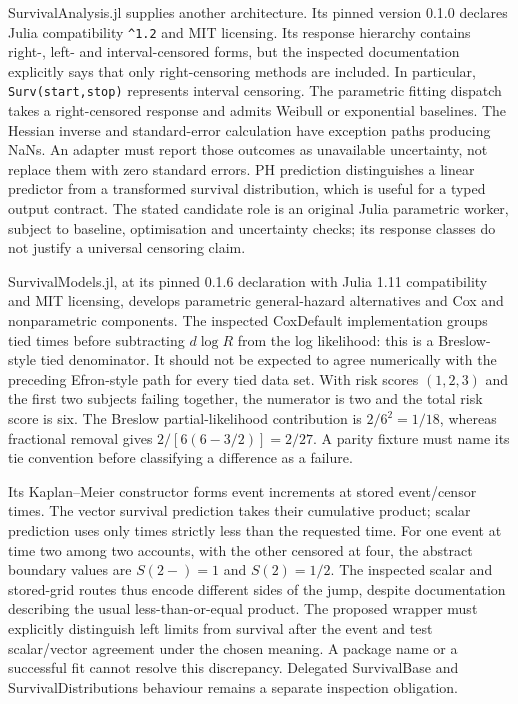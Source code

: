 SurvivalAnalysis.jl supplies another architecture. Its pinned version 0.1.0 declares
Julia compatibility \texttt{\^{}1.2} and MIT licensing. Its response hierarchy contains
right-, left- and interval-censored forms, but the inspected documentation explicitly
says that only right-censoring methods are included. In particular,
\texttt{Surv(start,stop)} represents interval censoring. The parametric fitting
dispatch takes a right-censored response and admits Weibull or exponential baselines.
The Hessian inverse and standard-error calculation have exception paths producing
NaNs. An adapter must report those outcomes as unavailable uncertainty, not replace
them with zero standard errors. PH prediction distinguishes a linear predictor from
a transformed survival distribution, which is useful for a typed output contract.
The stated candidate role is an original Julia parametric worker, subject to baseline,
optimisation and uncertainty checks; its response classes do not justify a universal
censoring claim.\citep{exec24_survivalother_juliaanalysis}

SurvivalModels.jl, at its pinned 0.1.6 declaration with Julia 1.11 compatibility and
MIT licensing, develops parametric general-hazard alternatives and Cox and
nonparametric components. The inspected CoxDefault implementation groups tied times
before subtracting $d\log R$ from the log likelihood: this is a Breslow-style tied
denominator. It should not be expected to agree numerically with the preceding
Efron-style path for every tied data set. With risk scores $(1,2,3)$ and the first
two subjects failing together, the numerator is two and the total risk score is six.
The Breslow partial-likelihood contribution is $2/6^2=1/18$, whereas fractional
removal gives $2/[6(6-3/2)]=2/27$. A parity fixture must name its tie convention
before classifying a difference as a failure.\citep{exec24_survivalother_juliamodels,exec24_survivalother_reference}

Its Kaplan--Meier constructor forms event increments at stored event/censor times.
The vector survival prediction takes their cumulative product; scalar prediction
uses only times strictly less than the requested time. For one event at time two
among two accounts, with the other censored at four, the abstract boundary values
are $S(2-)=1$ and $S(2)=1/2$. The inspected scalar and stored-grid routes thus encode
different sides of the jump, despite documentation describing the usual less-than-or-equal
product. The proposed wrapper must explicitly distinguish left limits from survival
after the event and test scalar/vector agreement under the chosen meaning. A package
name or a successful fit cannot resolve this discrepancy. Delegated SurvivalBase and
SurvivalDistributions behaviour remains a separate inspection obligation.
\citep{exec24_survivalother_juliamodels,exec24_survivalother_reference}

